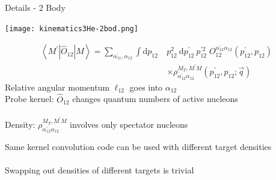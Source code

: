 \documentclass{beamer}
\DeclarePairedDelimiter\br{\langle}{\rvert}
\DeclarePairedDelimiter\kt{\lvert}{\rangle}
\newcommand{\bv}{\vec}
\begin{document}






\begin{frame}{Details - 2 Body}
\begin{center}
    \texttt{[image: kinematics3He-2bod.png]}
\end{center}
\begin{align*}
    \left\langle M^{\prime}\left|\hat{O}_{12}\right| M\right\rangle = \sum_{\alpha_{11}^{\prime}, \alpha_{12}} \int \mathrm{d} p_{12}\:& p_{12}^{2} \mathrm{~d} p_{12}^{\prime}\: p_{12}^{\prime 2}\; O_{12}^{\alpha_{12}^{\prime} \alpha_{12}}\left(p_{12}^{\prime}, p_{12}\right)\nonumber \\
    &\times\rho_{\alpha_{12}^{\prime} \alpha_{12}}^{M_{T}, M^{\prime} M}\left(p_{12}^{\prime}, p_{12} ; \bv{q}\right)
\end{align*}
Relative angular momentum $\ell_{12}$ goes into $\alpha_{12}$\\
Probe kernel: $\hat{O}_{12}$ changes quantum numbers of active nucleons\\~\\
Density: $\rho_{\alpha_{12}^{\prime} \alpha_{12}}^{M_{T}, M^{\prime} M}$ involves only spectator nucleons
\end{frame}



\begin{frame}
\begin{center}
    Same kernel convolution code can be used with different target densities\\~\\
    Swapping out densities of different targets is trivial
\end{center}
\end{frame}
\end{document}

